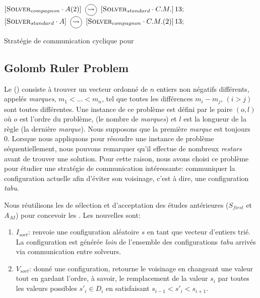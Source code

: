 \begin{algorithm}[!h]
\dontprintsemicolon
\SetNoline
$\left[\eqsolverposl{compagnon}\cdot A(2)\right] \oneton \left[\eqsolverposl{standard}\cdot C.M.\right]13;$\;
$\left[\eqsolverposl{standard}\cdot A\right] \oneton \left[\eqsolverposl{compagnon}\cdot C.M.(2)\right]13;$
\caption{Stratégie de communication cyclique \oneTn{} pour \NQP}\label{comm:nqueens_cyc_1n}
\end{algorithm}







\subsection{Golomb Ruler Problem}

Le \grp{} (\GRP) consiste à trouver un vecteur ordonné de $n$ entiers non négatifs différents, appelés \textit{marques}, $m_1<\dots<m_n$, tel que toutes les différences $m_i- m_j$, $(i>j)$ sont toutes différentes. Une instance de ce problème est défini par le paire $(o,l)$ où $o$ est l'ordre du problème, (le nombre de \textit{marques}) et  $l$ est la longueur de la règle (la dernière {\it marque}). Nous supposons que la première \textit{marque} est toujours 0. Lorsque nous appliquons \posl{} pour résoudre une instance de problème séquentiellement, nous pouvons remarquer qu'il effectue de nombreux {\it restars} avant de trouver une solution. Pour cette raison, nous avons choisi ce problème pour étudier une stratégie de communication intéressante: communiquer la configuration actuelle afin d'éviter son voisinage, c'est à dire, une configuration {\it tabu}.

Nous réutilisons les \ms{} de sélection et d'acceptation des études antérieures ($S_{first}$ et$A_{AI}$) pour concevoir les \ass. Les nouvelles \ms{} sont:
\begin{enumerate}
\item $I_{sort}$: renvoie une configuration aléatoire $s$ en tant que vecteur d'entiers trié. La configuration est générée \textit{loin} de l'ensemble des configurations {\it tabu} arrivés via communication entre solveurs.
\item $V_{sort}$: donné une configuration, retourne le voisinage en changeant une valeur tout en gardant l'ordre, à savoir, le remplacement de la valeur $s_i$ par toutes les valeurs possibles $s'_i \in D_i$ en satisfaisant $s_{i-1}< s'_i < s_{i+1}$.
\end{enumerate}

